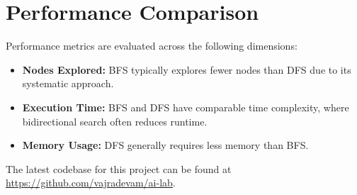\documentclass[final, journal, 11pt]{report}
\begin{document}
		
	
	\section*{Performance Comparison}
	Performance metrics are evaluated across the following dimensions:
	\begin{itemize}
		\item \textbf{Nodes Explored:} BFS typically explores fewer nodes than DFS due to its systematic approach.
		\item \textbf{Execution Time:} BFS and DFS have comparable time complexity, where bidirectional search often reduces runtime.
		\item \textbf{Memory Usage:} DFS generally requires less memory than BFS.
	\end{itemize}
	
	The latest codebase for this project can be found at \href{https://github.com/vajradevam/ai-lab}{https://github.com/vajradevam/ai-lab}.
	
\end{document}
